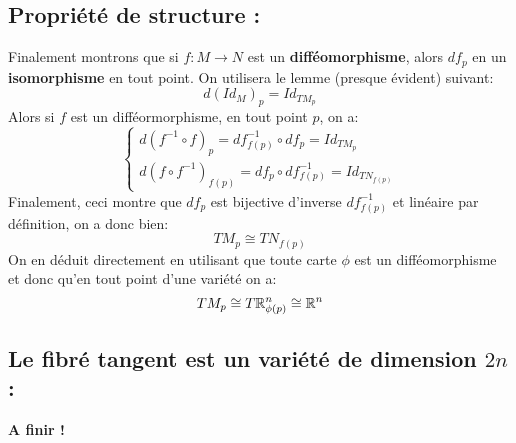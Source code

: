       \subsection*{Propriété de structure {:}}
      Finalement montrons que si \( f : M \longrightarrow N \) est un \textbf{difféomorphisme}, alors \( df_p \) en un \textbf{isomorphisme} en tout point. On utilisera le lemme (presque évident) suivant:
      \[ 
         d(Id_M)_p = Id_{TM_p} 
      \]
      Alors si \( f \) est un difféormorphisme, en tout point \( p \), on a:
      \[ 
         \begin{cases}
            d(f^{-1} \circ f)_p = df^{-1}_{f(p)} \circ df_p = Id_{TM_p}\\
            d(f \circ f^{-1})_{f(p)} = df_{p} \circ df^{-1}_{f(p)} = Id_{TN_{f(p)}}
         \end{cases}
      \]
      Finalement, ceci montre que \( df_p \) est bijective d'inverse \( df^{-1}_{f(p)} \) et linéaire par définition, on a donc bien:
      \[ 
         TM_p \cong TN_{f(p)} 
      \]
      On en déduit directement en utilisant que toute carte \( \phi \) est un difféomorphisme et donc qu'en tout point d'une variété on a:
      \[ 
         TM_p \cong T\mathbb{R}^n_{\phi(p)} \cong \mathbb{R}^n 
      \]

   \subsection*{Le fibré tangent est un variété de dimension \( 2n \) {:}}
      {\textbf{\color{red} A finir !}}
